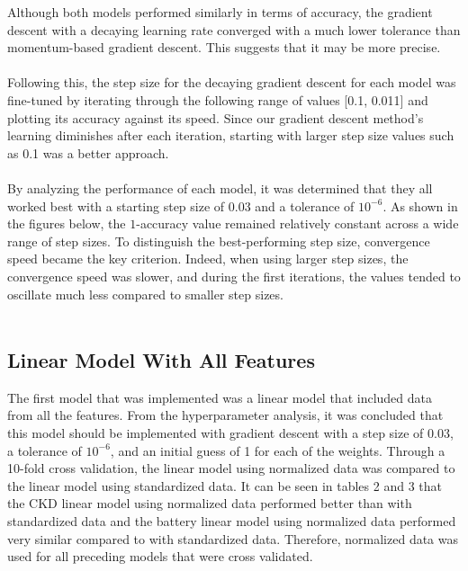 \documentclass{article}
\begin{document}
Although both models performed similarly in terms of accuracy, the gradient descent with a decaying learning rate converged with a much lower tolerance than momentum-based gradient descent. This suggests that it may be more precise.
\\
\\
Following this, the step size for the decaying gradient descent for each model was fine-tuned by iterating through the following range of values [0.1, 0.011] and plotting its accuracy against its speed. Since our gradient descent method’s learning diminishes after each iteration, starting with larger step size values such as 0.1 was a better approach.
\\
\\
By analyzing the performance of each model, it was determined that they all worked best with a starting step size of 0.03 and a tolerance of \( 10^{-6} \). As shown in the figures below, the \( 1 \)-accuracy value remained relatively constant across a wide range of step sizes. To distinguish the best-performing step size, convergence speed became the key criterion. Indeed, when using larger step sizes, the convergence speed was slower, and during the first iterations, the values tended to oscillate much less compared to smaller step sizes.
\\
\\
\subsection{Linear Model With All Features}

The first model that was implemented was a linear model that included data from all the features.  From the hyperparameter analysis, it was concluded that this model should be implemented with gradient descent with a step size of 0.03, a tolerance of $10^{-6}$, and an initial guess of 1 for each of the weights.  Through a 10-fold cross validation, the linear model using normalized data was compared to the linear model using standardized data.  It can be seen in tables 2 and 3 that the CKD linear model using normalized data performed better than with standardized data and the battery linear model using normalized data performed very similar compared to with standardized data.  Therefore, normalized data was used for all preceding models that were cross validated. 
\end{document}
